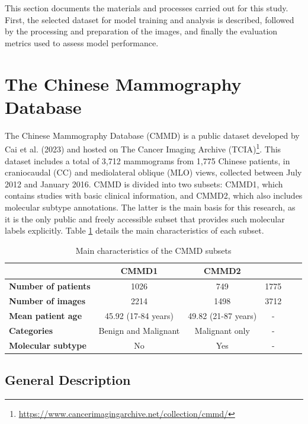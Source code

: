 \documentclass[a4paper,10pt]{book}
\begin{document}
This section documents the materials and processes carried out for this study. First, the selected dataset for model training and analysis is described, followed by the processing and preparation of the images, and finally the evaluation metrics used to assess model performance.

\section{The Chinese Mammography Database}

The Chinese Mammography Database (CMMD) is a public dataset developed by Cai et al. (2023) \cite{cai_online_2023} and hosted on The Cancer Imaging Archive (TCIA)\footnote{\url{https://www.cancerimagingarchive.net/collection/cmmd/}}. This dataset includes a total of 3,712 mammograms from 1,775 Chinese patients, in craniocaudal (CC) and mediolateral oblique (MLO) views, collected between July 2012 and January 2016. CMMD is divided into two subsets: CMMD1, which contains studies with basic clinical information, and CMMD2, which also includes molecular subtype annotations. The latter is the main basis for this research, as it is the only public and freely accessible subset that provides such molecular labels explicitly. Table \ref{tab:cmmd_features} details the main characteristics of each subset.

\begin{table}
        \caption[CMMD subsets characteristics]{Main characteristics of the CMMD subsets}
	\centering
	\begin{tabular}{lccccc}
		\toprule
		                            & \textbf{CMMD1}       & \textbf{CMMD2}      &      \\
		\midrule
		\textbf{Number of patients} & 1026                 & 749                 & 1775 \\
		\textbf{Number of images}   & 2214                 & 1498                & 3712 \\
		\textbf{Mean patient age}   & 45.92 (17-84 years)  & 49.82 (21-87 years) & -    \\
		\textbf{Categories}         & Benign and Malignant & Malignant only      & -    \\
		\textbf{Molecular subtype}  & No                   & Yes                 & -    \\
		\bottomrule
	\end{tabular}
	\label{tab:cmmd_features}
\end{table}


\subsection{General Description}
\end{document}
